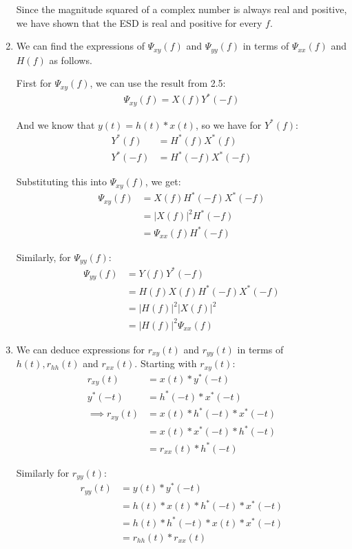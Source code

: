 \documentclass{article}
\begin{document}
\begin{enumerate}[label=2.\arabic*]
    Since the magnitude squared of a complex number is always real and positive, we have shown that the ESD is real and positive for every $f$.

    \item We can find the expressions of $\Psi_{xy}(f)$ and $\Psi_{yy}(f)$ in terms of $\Psi_{xx}(f)$ and $H(f)$ as follows.

    First for $\Psi_{xy}(f)$, we can use the result from 2.5:
    \begin{align*}
        \Psi_{xy}(f) =  X(f)Y^*(-f)
    \end{align*}

    And we know that $y(t) = h(t) \ast x(t)$, so we have for $Y^*(f)$:
    \begin{align*}
        Y^*(f) &= H^*(f)X^*(f) \\
        Y^*(-f) &= H^*(-f)X^*(-f)
    \end{align*}

    Substituting this into $\Psi_{xy}(f)$, we get:
    \begin{align*}
        \Psi_{xy}(f) &= X(f)H^*(-f)X^*(-f) \\
        &= |X(f)|^2H^*(-f) \\
        &= \Psi_{xx}(f)H^*(-f)
    \end{align*}

    Similarly, for $\Psi_{yy}(f)$:
    \begin{align*}
        \Psi_{yy}(f) &= Y(f)Y^*(-f) \\
        &= H(f)X(f)H^*(-f)X^*(-f) \\
        &= |H(f)|^2|X(f)|^2 \\
        &= |H(f)|^2\Psi_{xx}(f)
    \end{align*}

    \item We can deduce expressions for $r_{xy}(t)$ and $r_{yy}(t)$ in terms of $h(t), r_{hh}(t)$ and $r_{xx}(t)$. Starting with $r_{xy}(t)$:
    \begin{align*}
        r_{xy}(t) &= x(t) \ast y^*(-t) \\
        y^*(-t) &= h^*(-t) \ast x^*(-t) \\
        \implies r_{xy}(t) &= x(t) \ast h^*(-t) \ast x^*(-t) \\
        &= x(t) \ast x^*(-t) \ast h^*(-t) \\
        &= r_{xx}(t) \ast h^*(-t)
    \end{align*}

    Similarly for $r_{yy}(t)$:
    \begin{align*}
        r_{yy}(t) &= y(t) \ast y^*(-t) \\
        &= h(t) \ast x(t) \ast h^*(-t) \ast x^*(-t) \\
        &= h(t) \ast h^*(-t) \ast x(t) \ast x^*(-t) \\
        &= r_{hh}(t) \ast r_{xx}(t)
    \end{align*}

\end{enumerate}
\end{document}
